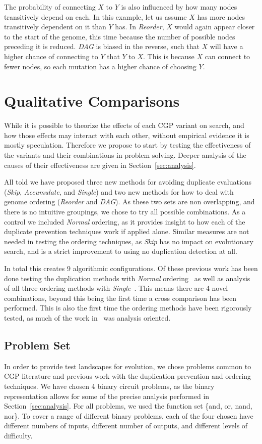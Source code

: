 \documentclass[journal]{IEEEtran}
\begin{document}
The probability of connecting $X$ to $Y$ is also influenced by how many nodes transitively depend on each.
In this example, let us assume $X$ has more nodes transitively dependent on it than $Y$ has.
In \emph{Reorder}, $X$ would again appear closer to the start of the genome, this time because the number
of possible nodes preceding it is reduced.  \emph{DAG} is biased in the reverse, such that $X$ will
have a higher chance of connecting to $Y$ that $Y$ to $X$.  This is because $X$ can connect to fewer
nodes, so each mutation has a higher chance of choosing $Y$.

\section{Qualitative Comparisons}
\label{sec:quality}
While it is possible to theorize the effects of each CGP variant on search, and
how those effects may interact with each other, without empirical evidence it is
mostly speculation.  Therefore we propose to start by testing the effectiveness
of the variants and their combinations in problem solving.  Deeper analysis of
the causes of their effectiveness are given in Section~\ref{sec:analysis}.

All told we have proposed three new methods for avoiding duplicate evaluations
(\emph{Skip}, \emph{Accumulate}, and \emph{Single}) and two new methods for
how to deal with genome ordering (\emph{Reorder} and \emph{DAG}).  As these two
sets are non overlapping, and there is no intuitive groupings, we chose to try
all possible combinations.  As a control we included \emph{Normal} ordering,
as it provides insight to how each of the duplicate prevention techniques work
if applied alone.  Similar measures are not needed in testing the ordering techniques,
as \emph{Skip} has no impact on evolutionary search, and is a strict improvement
to using no duplication detection at all.

In total this creates 9 algorithmic configurations.  Of these previous work
has been done testing the duplication methods with \emph{Normal} ordering~\cite{goldman:2013:cgpwaste}
as well as analysis of all three ordering methods with \emph{Single}~\cite{goldman:2013:ordering}.
This means there are 4 novel combinations, beyond this being the first time a cross
comparison has been performed.  This is also the first time the ordering methods
have been rigorously tested, as much of the work in~\cite{goldman:2013:ordering}
was analysis oriented.

\subsection{Problem Set}
In order to provide test landscapes for evolution, we chose problems common to
CGP literature and previous work with the duplication prevention and ordering
techniques.  We have chosen 4 binary circuit problems, as the binary representation
allows for some of the precise analysis performed in Section~\ref{sec:analysis}.
For all problems, we used the function set \{and, or, nand, nor\}.
To cover a range of different binary problems, each of the four chosen have
different numbers of inputs, different number of outputs, and different levels
of difficulty.
\end{document}
